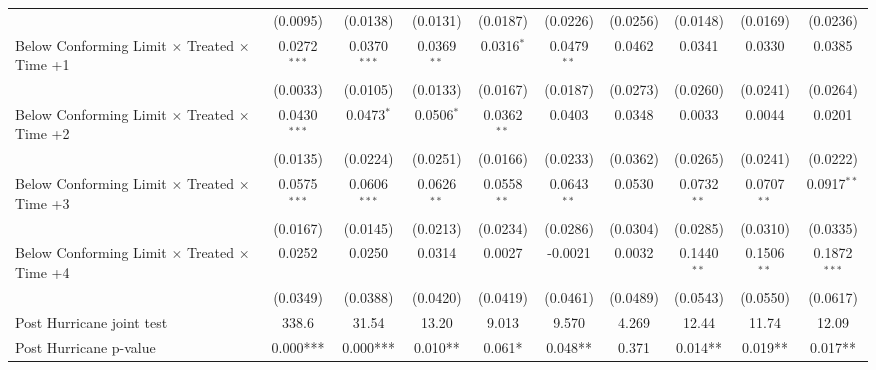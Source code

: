 \begin{tabular}{lccccccccc}
                                                              & (0.0095)               & (0.0138)       & (0.0131)      & (0.0187)      & (0.0226)       & (0.0256)      & (0.0148)      & (0.0169)      & (0.0236)\\   
   Below Conforming Limit $\times$ Treated $\times$ Time +1   & 0.0272$^{***}$         & 0.0370$^{***}$ & 0.0369$^{**}$ & 0.0316$^{*}$  & 0.0479$^{**}$  & 0.0462        & 0.0341        & 0.0330        & 0.0385\\   
                                                              & (0.0033)               & (0.0105)       & (0.0133)      & (0.0167)      & (0.0187)       & (0.0273)      & (0.0260)      & (0.0241)      & (0.0264)\\   
   Below Conforming Limit $\times$ Treated $\times$ Time +2   & 0.0430$^{***}$         & 0.0473$^{*}$   & 0.0506$^{*}$  & 0.0362$^{**}$ & 0.0403         & 0.0348        & 0.0033        & 0.0044        & 0.0201\\   
                                                              & (0.0135)               & (0.0224)       & (0.0251)      & (0.0166)      & (0.0233)       & (0.0362)      & (0.0265)      & (0.0241)      & (0.0222)\\   
   Below Conforming Limit $\times$ Treated $\times$ Time +3   & 0.0575$^{***}$         & 0.0606$^{***}$ & 0.0626$^{**}$ & 0.0558$^{**}$ & 0.0643$^{**}$  & 0.0530        & 0.0732$^{**}$ & 0.0707$^{**}$ & 0.0917$^{**}$\\   
                                                              & (0.0167)               & (0.0145)       & (0.0213)      & (0.0234)      & (0.0286)       & (0.0304)      & (0.0285)      & (0.0310)      & (0.0335)\\   
   Below Conforming Limit $\times$ Treated $\times$ Time +4   & 0.0252                 & 0.0250         & 0.0314        & 0.0027        & -0.0021        & 0.0032        & 0.1440$^{**}$ & 0.1506$^{**}$ & 0.1872$^{***}$\\   
                                                              & (0.0349)               & (0.0388)       & (0.0420)      & (0.0419)      & (0.0461)       & (0.0489)      & (0.0543)      & (0.0550)      & (0.0617)\\   
   Post Hurricane joint test                                  & 338.6                  & 31.54          & 13.20         & 9.013         & 9.570          & 4.269         & 12.44         & 11.74         & 12.09\\  
   Post Hurricane p-value                                     & 0.000***               & 0.000***       & 0.010**       & 0.061*        & 0.048**        & 0.371         & 0.014**       & 0.019**       & 0.017**\\  

\end{tabular}
